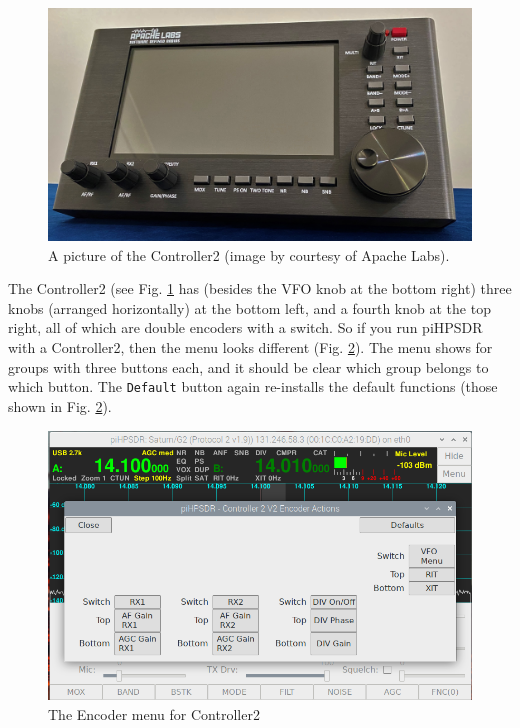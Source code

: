 \documentclass[12pt]{book}
\def\rett#1{\texttt{\color{red}#1}}
\begin{document}
\begin{figure}[ht!]
\center
\includegraphics[width=12cm]{Apache_Controller2.png}
\caption{A picture of the Controller2 (image by courtesy of Apache Labs).}
\label{fig:Apache_Controller2}
\end{figure}

The Controller2 (see Fig. \ref{fig:Apache_Controller2}
has (besides the VFO knob at the bottom right) three knobs (arranged horizontally) at the bottom left,
and a fourth knob at the top right, all of which are double encoders with a switch.
So if you run piHPSDR with a Controller2, then the menu looks different (Fig. \ref{fig:EncoderMenuV2}).
 The menu shows
for groups with three buttons each, and it should be clear which group belongs to which button. The
\rett{Default} button again re-installs the default functions (those shown in Fig. \ref{fig:EncoderMenuV2}).

\begin{figure}[ht!]
\center
\includegraphics[width=12cm]{EncoderMenuV2.png}
\caption{The Encoder menu for Controller2}
\label{fig:EncoderMenuV2}
\end{figure}
\end{document}
